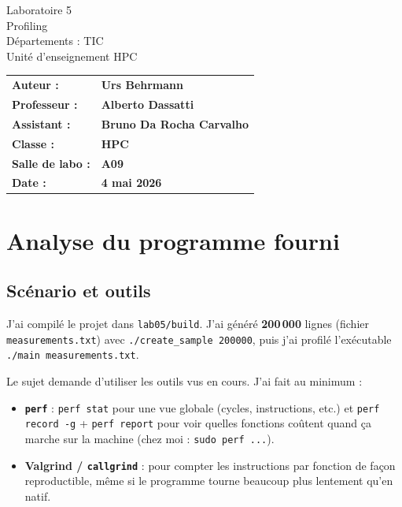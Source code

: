 \documentclass[a4paper,12pt]{article}
\begin{document}
\thispagestyle{firstpage}

\vspace*{2cm}
\begin{center}
    \Huge Laboratoire 5 \\
    \vspace{0.2cm}
    \Large Profiling \\
    \vspace{1cm}
    \small Départements : TIC\\
    Unité d'enseignement HPC\\
\end{center}

\vspace{9cm}
\renewcommand{\arraystretch}{1.5}
\begin{flushleft}
    \begin{tabular}{@{}l l@{}}
        \textbf{Auteur :}        & \textbf{Urs Behrmann} \\
        \textbf{Professeur :}    & \textbf{Alberto Dassatti} \\
        \textbf{Assistant :}     & \textbf{Bruno Da Rocha Carvalho} \\
        \textbf{Classe :}        & \textbf{HPC} \\
        \textbf{Salle de labo :} & \textbf{A09} \\
        \textbf{Date :}          & \textbf{4 mai 2026} \\
    \end{tabular}
\end{flushleft}

\newpage
\pagestyle{otherpages}
\tableofcontents
\newpage

\section{Analyse du programme fourni}

\subsection{Scénario et outils}
J'ai compilé le projet dans \texttt{lab05/build}. J'ai généré \textbf{200\,000} lignes (fichier \texttt{measurements.txt}) avec \texttt{./create\_sample 200000}, puis j'ai profilé l'exécutable \texttt{./main measurements.txt}.

Le sujet demande d'utiliser les outils vus en cours. J'ai fait au minimum :
\begin{itemize}
    \item \textbf{\texttt{perf}} : \texttt{perf stat} pour une vue globale (cycles, instructions, etc.) et \texttt{perf record -g} + \texttt{perf report} pour voir quelles fonctions coûtent quand ça marche sur la machine (chez moi : \texttt{sudo perf ...}).
    \item \textbf{Valgrind / \texttt{callgrind}} : pour compter les instructions par fonction de façon reproductible, même si le programme tourne beaucoup plus lentement qu'en natif.
\end{itemize}
\end{document}
